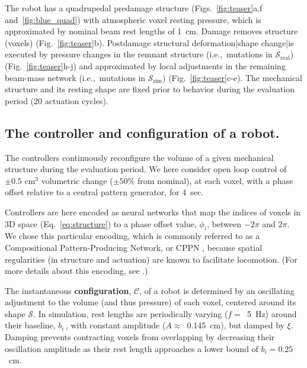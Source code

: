 The robot has a quadrupedal predamage structure (Figs.~\ref{fig:teaser}a,f and~\ref{fig:blue_quad}) with atmospheric voxel resting pressure, which is approximated by nominal beam rest lengths of 1~cm.
Damage removes structure (voxels) (Fig.~\ref{fig:teaser}b).
Postdamage structural deformation|shape change|is executed by pressure changes in the remnant structure (i.e.,~mutations in $\mathcal{S}_{\text{real}}$) \mbox{(Fig.~\ref{fig:teaser}h-j)} and approximated by local adjustments in the remaining beam-mass network (i.e.,~mutations in $\mathcal{S}_{\text{sim}}$) (Fig.~\ref{fig:teaser}c-e).
The mechanical structure and its resting shape are fixed prior to behavior during the evaluation period (20 actuation cycles).


\subsection{The controller and configuration of a robot.}
\label{sec:methods:controller}


The controllers continuously reconfigure the volume of a given mechanical structure during the evaluation period.
We here consider open loop control of 
$\pm0.5$ cm$^3$ volumetric change ($\pm50\%$ from nominal),
at each voxel, with a phase offset relative to a central pattern generator, for 4~sec.

Controllers are here encoded as neural networks that map the indices of voxels in 3D space (Eq.~\ref{eq:structure}) to a phase offset value, $\phi_i$, between $-2\pi$ and $2\pi$.
We chose this particular encoding, which is commonly referred to as a Compositional Pattern-Producing Network, or CPPN \cite{stanley2007compositional},
because spatial regularities (in structure and actuation) are known to facilitate locomotion.
(For more details about this encoding, see \cite{cheney2013unshackling}.)


The instantaneous \textbf{configuration}, 
$\mathcal{C}$,
of a robot is determined by an oscillating adjustment to the volume (and thus pressure) of each voxel,
centered around its shape $\mathcal{S}$.
In simulation, rest lengths are
periodically varying \mbox{($f=$ 5~Hz)} around their baseline, $b_i\,$,
with constant amplitude
\mbox{($A\approx$~0.145~cm)}, but damped by $\xi$.
Damping prevents contracting voxels from overlapping by decreasing their oscillation amplitude as their rest length approaches a lower bound of $b_i=0.25$~cm.

